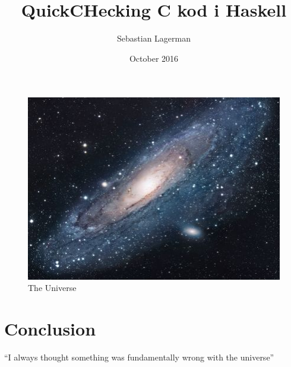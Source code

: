 \documentclass{article}
\title{QuickCHecking C kod i Haskell}
\author{Sebastian Lagerman }
\date{October 2016}
\begin{document}
\maketitle









%

\begin{figure}[h!]
\centering
\includegraphics[scale=1.7]{universe.jpg}
\caption{The Universe}
\label{fig:univerise}
\end{figure}

\section{Conclusion}
``I always thought something was fundamentally wrong with the universe'' \citep{adams1995hitchhiker}



\end{document}
